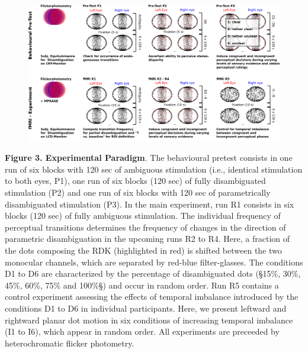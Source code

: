 \documentclass[12pt]{article}
\begin{document}
\clearpage
\begin{figure}[h]
\begin{center}
\includegraphics[width=16cm]{Figure_3.png}
\end{center}
\end{figure}

\textbf{Figure 3. Experimental Paradigm}.  The behavioural pretest consists in one run of six blocks with 120 sec of ambiguous stimulation (i.e., identical stimulation to both eyes, P1), one run of six blocks (120 sec) of fully disambiguated stimulation (P2) and one run of six blocks with 120 sec of parametrically disambiguated stimulation (P3). In the main experiment, run R1 consists in six blocks (120 sec) of fully ambiguous stimulation. The individual frequency of perceptual transitions determines the frequency of changes in the direction of parametric disambiguation in the upcoming runs R2 to R4. Here, a fraction of the dots composing the RDK (highlighted in red) is shifted between the two monocular channels, which are separated by red-blue filter-glasses. The conditions D1 to D6 are characterized by the percentage of disambiguated dots (§15\%, 30\%, 45\%, 60\%, 75\% and 100\%§) and occur in random order. Run R5 contains a control experiment assessing the effects of temporal imbalance introduced by the conditions D1 to D6 in individual participants. Here, we present leftward and rightward planar dot motion in six conditions of increasing temporal imbalance (I1 to I6), which appear in random order. All experiments are preceeded by heterochromatic flicker photometry. 
\end{document}
